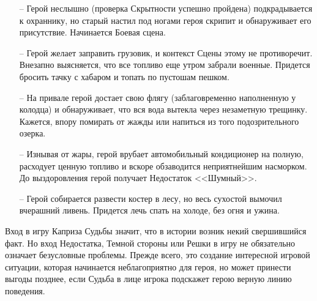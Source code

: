 \begin{enumerate}
\begin{enumerate}
\item[--]Герой неслышно (проверка Скрытности успешно пройдена) подкрадывается к охраннику, но старый настил под ногами героя скрипит и обнаруживает его присутствие. Начинается Боевая сцена.
\item[--]Герой желает заправить грузовик, и контекст Сцены этому не противоречит. Внезапно выясняется, что все топливо еще утром забрали военные. Придется бросить тачку с хабаром и топать по пустошам пешком.
\item[--]На привале герой достает свою флягу (заблаговременно наполненную у колодца) и обнаруживает, что вся вода вытекла через незаметную трещинку. Кажется, впору помирать от жажды или напиться из того подозрительного озерка.
\item[--]Изнывая от жары, герой врубает автомобильный кондиционер на полную, расходует ценную топливо и вскоре обзаводится неприятнейшим насморком. До выздоровления герой получает Недостаток <<Шумный>>.
\item[--]Герой собирается развести костер в лесу, но весь сухостой вымочил вчерашний ливень. Придется лечь спать на холоде, без огня и ужина.
\end{enumerate}
\end{enumerate}
\begin{tcolorbox}
Вход в игру Каприза Судьбы значит, что в истории возник некий свершившийся факт. Но вход Недостатка, Темной стороны или Решки в игру не обязательно означает безусловные проблемы.
\newline Прежде всего, это создание интересной игровой ситуации, которая начинается неблагоприятно для героя, но может принести выгоды позднее, если Судьба в лице игрока подскажет герою верную линию поведения.
\end{tcolorbox}
